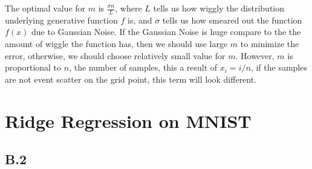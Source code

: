 \documentclass[]{article}
\begin{document}
		The optimal value for $m$ is $\frac{\sigma n}{L}$, where $L$ tells us how wiggly the distribution underlying generative function $f$ is, and $\sigma$ tells us how smeared out the function $f(x)$ due to Gaussian Noise. If the Gaussian Noise is huge compare to the the amount of wiggle the function has, then we should use large $m$ to minimize the error, otherwise, we should choose relatively small value for $m$. However, $m$ is proportional to $n$, the number of samples, this a result of $x_i = i/n$, if the samples are not event scatter on the grid point, this term will look different. 
\section*{Ridge Regression on MNIST}
	\subsection*{B.2}
		
		 
\end{document}
